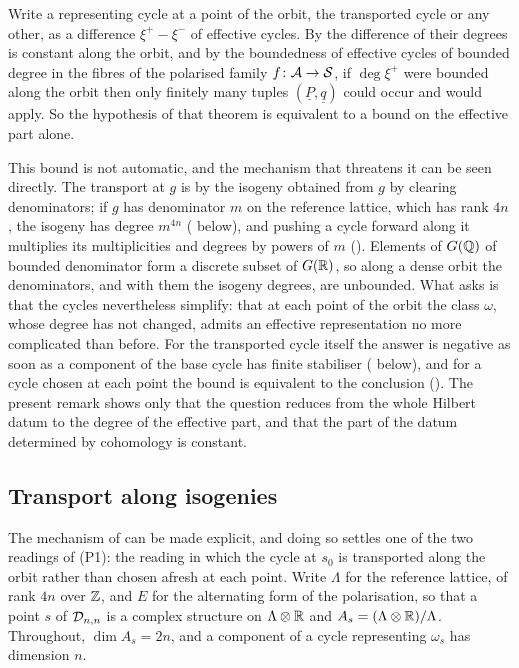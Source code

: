 \begin{remark}
\label{rem:whereunbounded}
Write a representing cycle at a point of the orbit, the transported cycle or
any other, as a difference $\xi^{+}-\xi^{-}$ of effective cycles. By
 the difference of their degrees is constant along
the orbit, and by the boundedness of effective cycles of bounded degree in
the fibres of the polarised family $f\colon\mathcal{A}\to\mathcal{S}$, if $\deg\xi^{+}$ were
bounded along the orbit then only finitely many tuples
$(\underline{P},\underline{q})$ could occur and  would
apply. So the hypothesis of that theorem is equivalent to a bound on the
effective part alone.

This bound is not automatic, and the mechanism that threatens it can be seen
directly. The transport at $g$ is by the isogeny obtained from $g$ by
clearing denominators; if $g$ has denominator $m$ on the reference lattice,
which has rank $4n$, the isogeny has degree $m^{4n}$ (
below), and pushing a cycle forward along it multiplies its multiplicities
and degrees by powers of $m$ (). Elements of $G(\mathbb{Q})$ of bounded denominator form a discrete subset of
$G(\mathbb{R})$, so along a dense orbit the denominators, and with them the isogeny
degrees, are unbounded. What  asks is that the cycles
nevertheless simplify: that at each point of the orbit the class $\omega$,
whose degree has not changed, admits an effective representation no more
complicated than before. For the transported cycle itself the answer is
negative as soon as a component of the base cycle has finite stabiliser
( below), and for a cycle chosen at each point the bound
is equivalent to the conclusion (). The present remark
shows only that the question reduces from the whole Hilbert datum to the
degree of the effective part, and that the part of the datum determined by
cohomology is constant.
\end{remark}

\subsection{Transport along isogenies}

The mechanism of  can be made explicit, and doing
so settles one of the two readings of \textup{(P1)}: the reading in
which the cycle at $s_{0}$ is transported along the orbit rather than chosen
afresh at each point. Write $\Lambda$ for the reference lattice, of rank $4n$
over $\mathbb{Z}$, and $E$ for the alternating form of the polarisation, so that a
point $s$ of $\mathcal{D}_{n,n}$ is a complex structure on $\Lambda\otimes\mathbb{R}$ and
$A_{s}=(\Lambda\otimes\mathbb{R})/\Lambda$. Throughout, $\dim A_{s}=2n$, and a
component of a cycle representing $\omega_{s}$ has dimension $n$.

